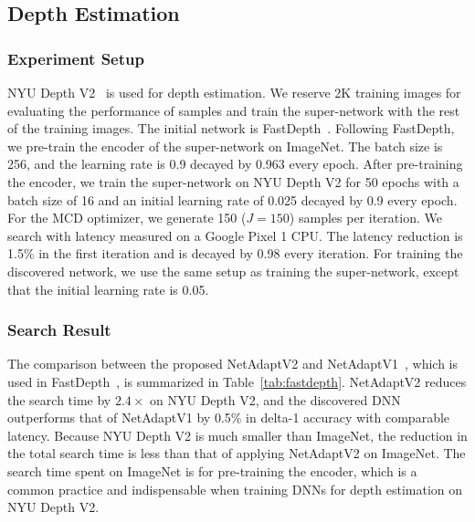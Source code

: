 \subsection{Depth Estimation}
\label{subsec:depth_estimation}
\subsubsection{Experiment Setup}
\label{subsubsec:depth_estimation_experiment_setup}

NYU Depth V2~\cite{nyudepth} is used for depth estimation. We reserve 2K training images for evaluating the performance of samples and train the super-network with the rest of the training images. The initial network is FastDepth~\cite{icra_2019_fastdepth}.
Following FastDepth, we pre-train the encoder of the super-network on ImageNet.
The batch size is 256, and the learning rate is 0.9 decayed by 0.963 every epoch. After pre-training the encoder,  we train the super-network on NYU Depth V2 for 50 epochs with a batch size of 16 and an initial learning rate of 0.025 decayed by 0.9 every epoch. For the MCD optimizer, we generate 150 ($J=150$) samples per iteration. We search with latency measured on a Google Pixel 1 CPU. The latency reduction is 1.5\% in the first iteration and is decayed by 0.98 every iteration. For training the discovered network, we use the same setup as training the super-network, except that the initial learning rate is 0.05. 

\subsubsection{Search Result}

The comparison between the proposed NetAdaptV2 and NetAdaptV1~\cite{eccv2018-netadapt}, which is used in FastDepth~\cite{icra_2019_fastdepth}, is summarized in Table~\ref{tab:fastdepth}. NetAdaptV2 reduces the search time by $2.4\times$ on NYU Depth V2, and the discovered DNN outperforms that of NetAdaptV1 by 0.5\% in delta-1 accuracy with comparable latency. Because NYU Depth V2 is much smaller than ImageNet, the reduction in the total search time is less than that of applying NetAdaptV2 on ImageNet. The search time spent on ImageNet is for pre-training the encoder, which is a common practice and indispensable when training DNNs for depth estimation on NYU Depth V2.

